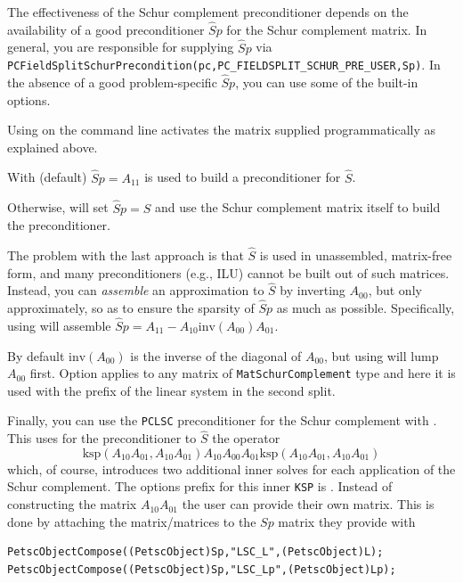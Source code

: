 The effectiveness of the Schur complement preconditioner depends on the availability of a good preconditioner $\hat Sp$ for the Schur complement matrix.
In general, you are responsible for supplying $\hat Sp$ via
\lstinline{PCFieldSplitSchurPrecondition(pc,PC_FIELDSPLIT_SCHUR_PRE_USER,Sp)}.
In the absence of a good
problem-specific $\hat Sp$, you can use some of the built-in options.

Using  on the command line activates
the matrix supplied programmatically as explained above.

With  (default) $\hat Sp = A_{11}$ is used to build a
preconditioner for $\hat S$.

Otherwise,  will set $\hat Sp = \hat S$ and use the Schur complement matrix itself to build the preconditioner.

The problem with the last approach is that $\hat S$ is used in unassembled, matrix-free form, and many preconditioners (e.g., ILU) cannot be built out of
such matrices. Instead, you can \emph{assemble}  an approximation to $\hat S$ by inverting $A_{00}$, but only approximately, so as to ensure the sparsity of $\hat Sp$ as much as possible.
Specifically, using  will assemble $\hat Sp = A_{11} - A_{10} \text{inv}(A_{00}) A_{01}$.

By default $\text{inv}(A_{00})$ is the inverse of the diagonal of $A_{00}$, but using  will lump $A_{00}$ first.  Option 
applies to any matrix of \lstinline{MatSchurComplement} type and here it is used with the prefix  of the linear system in the second split.

Finally, you can use the \lstinline{PCLSC} preconditioner for the Schur complement with . This uses for the preconditioner to $\hat{S}$ the operator
\[
  \text{ksp}(A_{10} A_{01},A_{10} A_{01}) A_{10} A_{00} A_{01} \text{ksp}(A_{10} A_{01},A_{10} A_{01})
\]
 which, of course, introduces two additional inner solves for each application of the Schur complement. The options prefix for this inner \lstinline{KSP} is . Instead of constructing the matrix $A_{10} A_{01}$ the user can provide their own matrix. This is done by attaching the matrix/matrices to the $ Sp $ matrix they provide with
\begin{lstlisting}
PetscObjectCompose((PetscObject)Sp,"LSC_L",(PetscObject)L); 
PetscObjectCompose((PetscObject)Sp,"LSC_Lp",(PetscObject)Lp);
\end{lstlisting}

